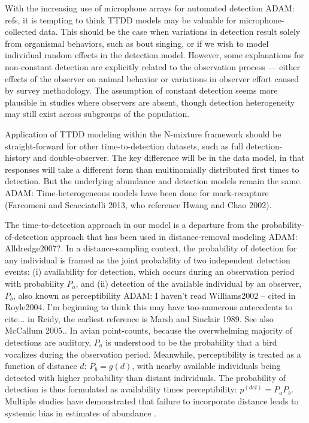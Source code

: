 \documentclass[useAMS,usenatbib,referee,12pt]{article}
\newcommand{\adam}[1]{{\color{blue} ADAM: #1}}
\begin{document}
With the increasing use of microphone arrays for automated detection \adam{refs}, it is tempting to think TTDD models may be valuable for microphone-collected data.  This should be the case when variations in detection result solely from organismal behaviors, such as bout singing, or if we wish to model individual random effects in the detection model.  However, some explanations for non-constant detection are explicitly related to the observation process --- either effects of the observer on animal behavior or variations in observer effort caused by survey methodology.  The assumption of constant detection seems more plausible in studies where observers are absent, though detection heterogeneity may still exist across subgroups of the population.

Application of TTDD modeling within the N-mixture framework should be straight-forward for other time-to-detection datasets, such as full detection-history and double-observer.  The key difference will be in the data model, in that responses will take a different form than multinomially distributed first times to detection.  But the underlying abundance and detection models remain the same.  \adam{Time-heterogeneous models have been done for mark-recapture (Farcomeni and Scacciatelli 2013, who reference Hwang and Chao 2002).}

The time-to-detection approach in our model is a departure from the probability-of-detection approach that has been used in distance-removal modeling \citep{Farnsworth2005, Diefenbach2007, Solymos2013, Amundson2014}\adam{Alldredge2007?}.  In a distance-sampling context, the probability of detection for any individual is framed as the joint probability of two independent detection events: (i) availability for detection, which occurs during an observation period with probability $P_a$, and (ii) detection of the available individual by an observer, $P_b$, also known as perceptibility \citep{Williams2002, Kery2008, Nichols2009}\adam{I haven't read Williams2002 -- cited in Royle2004.  I'm  beginning to think this may have too-numerous antecedents to cite... in Reidy, the earliest reference is Marsh and Sinclair 1989.  See also McCallum 2005.}.  In avian point-counts, because the overwhelming majority of detections are auditory, $P_a$ is understood to be the probability that a bird vocalizes during the observation period.  Meanwhile, perceptibility is treated as a function of distance $d$: $P_b = g(d)$, with nearby available individuals being detected with higher probability than distant individuals.  The probability of detection is thus formulated as availability times perceptibility: $p^{(det)} = P_aP_b$.  Multiple studies have demonstrated that failure to incorporate distance leads to systemic bias in estimates of abundance \citep{EffordDawson2009, Solymos2013}.
\end{document}

